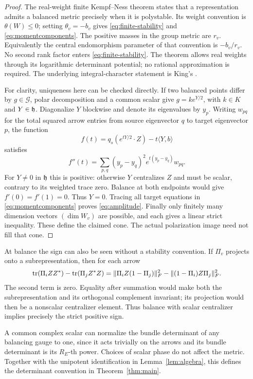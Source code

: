 \begin{proof}
The real-weight finite Kempf--Ness theorem
\cite[\S5.1, Theorem~5.1]{hkkp2023} states that a representation admits
a balanced metric precisely when it is polystable. Its weight convention
is $\theta(W)\le0$; setting $\theta_v=-b_v$ gives
\eqref{eq:finite-stability} and \eqref{eq:momentcomponents}.
The positive masses in the group metric are $r_v$. Equivalently the
central endomorphism parameter of that convention is $-b_v/r_v$.
No second rank factor enters \eqref{eq:finite-stability}.
The theorem allows real weights through its logarithmic determinant
potential; no rational approximation is required. The underlying
integral-character statement is King's
\cite[Propositions~3.1--3.2 and Theorem~6.1]{king1994}.

For clarity, uniqueness here can be checked directly. If two balanced
points differ by $g\in\mathcal G$, polar decomposition and a common
scalar give $g=ke^{Y/2}$, with $k\in K$ and $Y\in\mathfrak h$.
Diagonalize $Y$ blockwise and denote its eigenvalues by $y_p$.
Writing $w_{pq}$ for the total squared arrow entries from source
eigenvector $q$ to target eigenvector $p$, the function
\begin{equation}\label{eq:convexpotential}
f(t)=q_s(e^{tY/2}\cdot Z)-t\langle Y,b\rangle
\end{equation}
satisfies
\[
f''(t)=\sum_{p,q}(y_p-y_q)^2e^{t(y_p-y_q)}w_{pq}.
\]
For $Y\ne0$ in $\mathfrak h$ this is positive: otherwise $Y$ centralizes
$Z$ and must be scalar, contrary to its weighted trace zero.
Balance at both endpoints would give $f'(0)=f'(1)=0$.
Thus $Y=0$. Tracing all target equations in
\eqref{eq:momentcomponents} proves \eqref{eq:amplitude}.
Finally only finitely many dimension vectors $(\dim W_v)$ are
possible, and each gives a linear strict inequality. These define the
claimed cone. The actual polarization image need not fill that cone.
\end{proof}

At balance the sign can also be seen without a stability convention.
If $\Pi_v$ projects onto a subrepresentation, then for each arrow
\[
\operatorname{tr}(\Pi_iZZ^*)-\operatorname{tr}(\Pi_jZ^*Z)
=\|\Pi_iZ(1-\Pi_j)\|_F^2-\|(1-\Pi_i)Z\Pi_j\|_F^2.
\]
The second term is zero. Equality after summation would make both
the subrepresentation and its orthogonal complement invariant; its
projection would then be a nonscalar centralizer element. Thus balance
with scalar centralizer implies precisely the strict positive sign.

A common complex scalar can normalize the bundle determinant of any
balancing gauge to one, since it acts trivially on the arrows and its
bundle determinant is its $R_E$-th power. Choices of scalar phase do
not affect the metric. Together with the unipotent identification in
Lemma~\ref{lem:algebra}, this defines the determinant convention in
Theorem~\ref{thm:main}.
